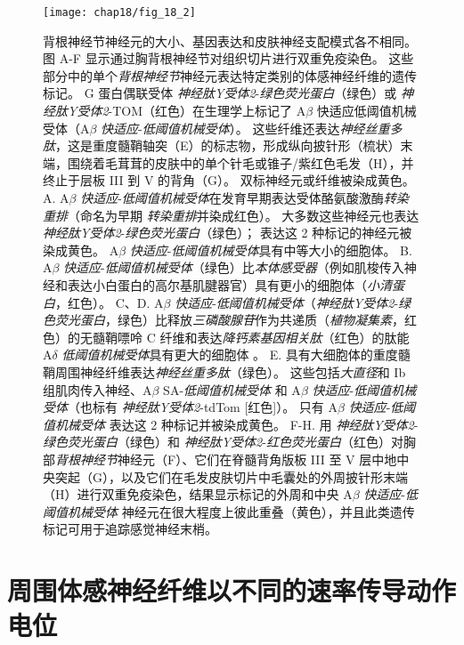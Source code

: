 \begin{figure}[htbp]
	\centering
	\texttt{[image: chap18/fig\_18\_2]}
	\caption{背根神经节神经元的大小、基因表达和皮肤神经支配模式各不相同\cite{li2011functional}。
		图 A-F 显示通过胸背根神经节对组织切片进行双重免疫染色。
		这些部分中的单个\textit{背根神经节}神经元表达特定类别的体感神经纤维的遗传标记。
		G 蛋白偶联受体 \textit{神经肽Y受体2}-\textit{绿色荧光蛋白}（绿色）或 \textit{神经肽Y受体2}-TOM（红色）在生理学上标记了 A$\beta$ 快适应低阈值机械受体（A$\beta$ \textit{快适应}-\textit{低阈值机械受体}）。
		这些纤维还表达\textit{神经丝重多肽}，这是重度髓鞘轴突（E）的标志物，形成纵向披针形（梳状）末端，围绕着毛茸茸的皮肤中的单个针毛或锥子/紫红色毛发（H），并终止于层板 III 到 V 的背角（G）。 
		双标神经元或纤维被染成黄色。
		A. A$\beta$ \textit{快适应}-\textit{低阈值机械受体}在发育早期表达受体酪氨酸激酶\textit{转染重排}（命名为早期 \textit{转染重排}并染成红色）。
		大多数这些神经元也表达 \textit{神经肽Y受体2}-\textit{绿色荧光蛋白}（绿色）；
		表达这 2 种标记的神经元被染成黄色。 A$\beta$ \textit{快适应}-\textit{低阈值机械受体}具有中等大小的细胞体。
		B. A$\beta$ \textit{快适应}-\textit{低阈值机械受体}（绿色）比\textit{本体感受器}（例如肌梭传入神经和表达小白蛋白的高尔基肌腱器官）具有更小的细胞体（\textit{小清蛋白}，红色）。
		C、D. A$\beta$ \textit{快适应}-\textit{低阈值机械受体}（\textit{神经肽Y受体2}-\textit{绿色荧光蛋白}，绿色）比释放\textit{三磷酸腺苷}作为共递质（\textit{植物凝集素}，红色）的无髓鞘嘌呤 C 纤维和表达\textit{降钙素基因相关肽}（红色）的肽能 A$\delta$ \textit{低阈值机械受体}具有更大的细胞体 。
		E. 具有大细胞体的重度髓鞘周围神经纤维表达\textit{神经丝重多肽}（绿色）。
		这些包括\textit{大直径}和 Ib 组肌肉传入神经、A$\beta$ SA-\textit{低阈值机械受体} 和 A$\beta$ \textit{快适应}-\textit{低阈值机械受体}（也标有 \textit{神经肽Y受体2}-tdTom [红色]）。
		只有 A$\beta$ \textit{快适应}-\textit{低阈值机械受体} 表达这 2 种标记并被染成黄色。
		F-H. 用 \textit{神经肽Y受体2}-\textit{绿色荧光蛋白}（绿色）和 \textit{神经肽Y受体2}-\textit{红色荧光蛋白}（红色）对胸部\textit{背根神经节}神经元（F）、它们在脊髓背角版板 III 至 V 层中地中央突起（G），以及它们在毛发皮肤切片中毛囊处的外周披针形末端（H）进行双重免疫染色，结果显示标记的外周和中央 A$\beta$ \textit{快适应}-\textit{低阈值机械受体} 神经元在很大程度上彼此重叠（黄色），并且此类遗传标记可用于追踪感觉神经末梢。}
	\label{fig:18_2}
\end{figure}



\section{周围体感神经纤维以不同的速率传导动作电位}


